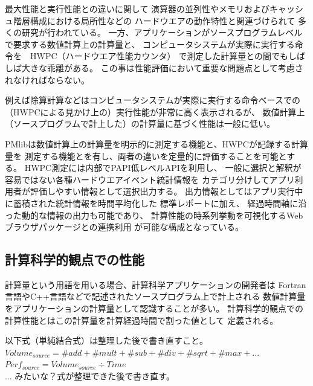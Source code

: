 \documentclass[submit,techrep,noauthor]{ipsj}
\begin{document}
最大性能と実行性能との違いに関して
演算器の並列性やメモリおよびキャッシュ階層構成における局所性などの
ハードウエアの動作特性と関連づけられて
多くの研究が行われている。
一方、アプリケーションがソースプログラムレベルで要求する数値計算上の計算量と、
コンピュータシステムが実際に実行する命令を　HWPC（ハードウエア性能カウンタ）
で測定した計算量との間でもしばしば大きな乖離がある。
この事は性能評価において重要な問題点として考慮されなければならない。

{ \color{BLUE}
例えば除算計算などはコンピュータシステムが実際に実行する命令ベースでの
（HWPCによる見かけ上の）実行性能が非常に高く表示されるが、
数値計算上（ソースプログラムで計上した）の計算量に基づく性能は一般に低い。
}

PMlibは数値計算上の計算量を明示的に測定する機能と、HWPCが記録する計算量を
測定する機能とを有し、両者の違いを定量的に評価することを可能とする。
HWPC測定には内部でPAPI低レベルAPIを利用し、
一般に選択と解釈が容易ではない各種ハードウエアイベント統計情報を
カテゴリ分けしてアプリ利用者が評価しやすい情報として選択出力する。
出力情報としてはアプリ実行中に蓄積された統計情報を時間平均化した
標準レポートに加え、
経過時間軸に沿った動的な情報の出力も可能であり、
計算性能の時系列挙動を可視化するWebブラウザパッケージとの連携利用
が可能な構成となっている。


\subsection {計算科学的観点での性能}
計算量という用語を用いる場合、計算科学アプリケーションの開発者は
Fortran言語やC++言語などで記述されたソースプログラム上で計上される
数値計算量をアプリケーションの計算量として認識することが多い。
計算科学的観点での計算性能とはこの計算量を計算経過時間で割った値として
定義される。

{ \color{BLUE}
以下式（単純結合式）は整理した後で書き直すこと。\\
\begin{math}
Volume_{source} = \#add + \#mult + \#sub + \#div + \#sqrt + \#max + ...
\end{math}\\
\begin{math}
Perf_{source} = Volume_{source} \div Time
\end{math}\\
... みたいな？式が整理できた後で書き直す。\\
}
\end{document}
